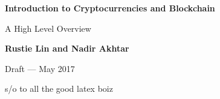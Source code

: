 \documentclass[titlepage]{article}
\begin{document}
    
\begin{titlepage}
    \begin{center}
        \vspace*{1cm}
        
        \textbf{\huge Introduction to Cryptocurrencies and Blockchain}
        
        \vspace{0.5cm}
        {\LARGE A High Level Overview} 
        
        \vspace{1.5cm}
        
        \textbf{Rustie Lin and Nadir Akhtar}
        
        Draft --- May 2017 %
        
        \vfill
        
        s/o to all the good latex boiz 
        
        
        \vspace{0.8cm}
        
        
        
        
        
        
    \end{center}
\end{titlepage}
    
    
\end{document}

